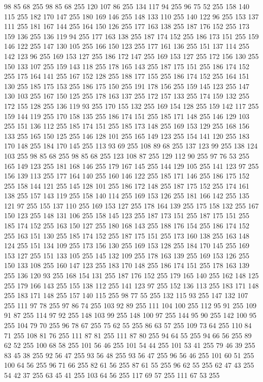 98 85 68 255 98 85 68 255 120 107 86 255 134 117 94 255 96 75 52 255 158 140 115 255 182 170 147 255 180 169 146 255 148 133 110 255 140 122 96 255 153 137 111 255 181 167 144 255 164 150 126 255 177 163 138 255 187 176 152 255 173 159 136 255 136 119 94 255 177 163 138 255 187 174 152 255 186 173 151 255 159 146 122 255 147 130 105 255 166 150 123 255 177 161 136 255 151 137 114 255 142 123 96 255 169 153 127 255 186 172 147 255 169 153 127 255 172 156 130 255 150 133 107 255 159 143 118 255 178 165 143 255 187 175 151 255 186 174 152 255 175 164 141 255 167 152 128 255 188 177 155 255 186 174 152 255 164 151 130 255 185 175 153 255 186 175 150 255 191 178 156 255 159 145 123 255 147 130 103 255 167 150 125 255 178 163 137 255 172 157 133 255 174 159 132 255 172 155 128 255 136 119 93 255 170 155 132 255 169 154 128 255 159 142 117 255 159 144 119 255 170 158 135 255 186 174 151 255 185 171 148 255 146 129 103 255 151 136 112 255 185 174 151 255 185 173 148 255 169 153 129 255 168 156 133 255
165 150 125 255 146 128 101 255 165 149 123 255 154 141 120 255 183 170 148 255 184 170 145 255 113 93 69 255 108 89 68 255 137 123 99 255 138 124 103 255 98 85 68 255 98 85 68 255 123 108 87 255 129 112 90 255 97 76 53 255 165 149 123 255 181 168 146 255 179 167 145 255 144 129 105 255 141 123 97 255 156 139 113 255 177 164 140 255 160 146 122 255 185 171 146 255 186 175 152 255 158 144 121 255 145 128 101 255 186 172 148 255 187 175 152 255 174 161 138 255 157 143 119 255 158 140 114 255 169 153 126 255 181 166 142 255 135 121 97 255 155 137 110 255 169 153 127 255 178 164 139 255 175 158 132 255 167 150 123 255 148 131 106 255 158 145 123 255 187 173 151 255 187 175 151 255 185 174 152 255 163 150 127 255 180 168 143 255 188 176 154 255 186 174 152 255 163 151 130 255 185 174 152 255 187 175 151 255 173 160 138 255 163 148 124 255 151 134 109 255 173 156 130 255 169 153 128 255 184 170 145 255 169 153 127 255 151 133 105 255 145 132 109 255 178 163 139 255 169 153 126 255 150 133 108 255
160 147 123 255 183 170 148 255 186 174 151 255 178 163 139 255 136 120 93 255 168 154 131 255 187 176 152 255 179 165 140 255 162 148 125 255 179 166 143 255 155 138 112 255 141 123 97 255 152 136 113 255 183 171 148 255 183 171 148 255 157 140 115 255 98 77 55 255 132 115 93 255 147 132 107 255 111 97 78 255 97 86 74 255 103 92 89 255 111 104 100 255 112 95 91 255 109 91 87 255 114 97 92 255 148 103 99 255 148 100 97 255 144 95 90 255 142 100 95 255 104 79 70 255 96 78 67 255 75 62 55 255 86 63 57 255 109 73 64 255 110 84 71 255 108 81 76 255 111 87 81 255 111 87 80 255 94 64 55 255 94 66 56 255 89 62 52 255 100 68 58 255 101 56 46 255 101 54 44 255 101 53 41 255 79 46 39 255 83 45 38 255 92 56 47 255 93 56 48 255 93 56 47 255 96 56 46 255 101 60 51 255 100 64 56 255 96 71 66 255 82 61 56 255 87 61 55 255 96 62 55 255 62 47 43 255 54 42 37 255 63 45 41 255 103 64 56 255 117 69 57 255 111 67 53 255
